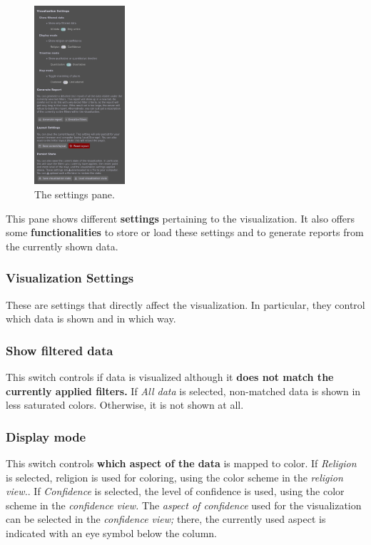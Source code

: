 \begin{figure}[tb]
  \centering
  \includegraphics[width=0.3\textwidth]{../src/assets/visualization-documentation/settings.png}
  \caption{
    The settings pane.
  }
  \label{fig:settings}
\end{figure}

This pane shows different \textbf{settings} pertaining to the visualization.
It also offers some \textbf{functionalities} to store or load these settings and to generate reports from the currently shown data.


\subsubsection{Visualization Settings}
\label{sec:settings-vis-settings}

These are settings that directly affect the visualization.
In particular, they control which data is shown and in which way.

\subsubsection{Show filtered data}
\label{sec:settings-all-data-only-active}

This switch controls if data is visualized although it \textbf{does not match the currently applied filters.}
If \emph{All data} is selected, non-matched data is shown in less saturated colors.
Otherwise, it is not shown at all.


\subsubsection{Display mode}
\label{sec:settings-display-mode}

This switch controls \textbf{which aspect of the data} is mapped to color.
If \emph{Religion} is selected, religion is used for coloring, using the color scheme in the \emph{religion view.}.
If \emph{Confidence} is selected, the level of confidence is used, using the color scheme in the \emph{confidence view.}
The \emph{aspect of confidence} used for the visualization can be selected in the \emph{confidence view;}
there, the currently used aspect is indicated with an eye symbol below the column.


